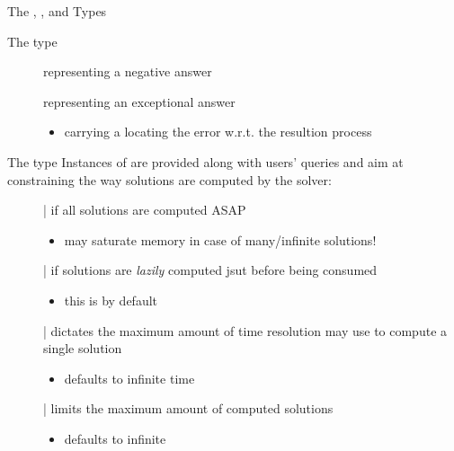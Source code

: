 \documentclass[handout]{beamer}
\begin{document}
\begin{frame}[allowframebreaks]{The , , and  Types}
\begin{block}{The  type}
\begin{description}
            \item[] representing a negative answer

            \item[] representing an exceptional answer
            \begin{itemize}\small
                \item carrying a  locating the error w.r.t. the resultion process
            \end{itemize}
        \end{description}
    \end{block}

    \begin{block}{The  type}
        Instances of  are provided along with users' queries and aim at constraining the way solutions are computed by the solver:
        \begin{description}
            \item[] | if  all solutions are computed ASAP
            \begin{itemize}\small
                \item may saturate memory in case of many/infinite solutions!
            \end{itemize} 
            
            \item[] | if  solutions are \emph{lazily} computed jsut before being consumed
            \begin{itemize}\small
                \item this is  by default
            \end{itemize}  

            \item[] | dictates the \alert{maximum} amount of time resolution may use to compute a single solution
            \begin{itemize}\small
                \item defaults to infinite time
            \end{itemize} 
            
            \item[] | limits the \alert{maximum} amount of computed solutions 
            \begin{itemize}\small
                \item defaults to infinite
            \end{itemize}
        \end{description}
    \end{block}


\end{frame}
\end{document}
